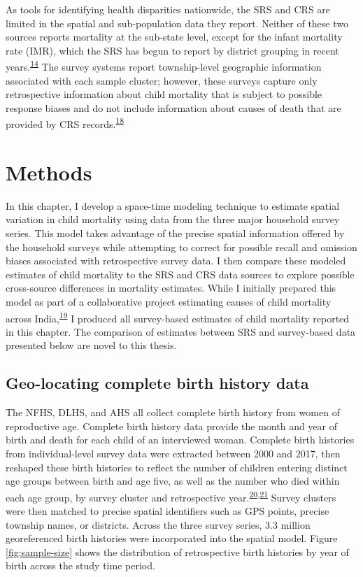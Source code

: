 \documentclass[
]{article}
\begin{document}
As tools for identifying health disparities nationwide, the SRS and CRS are limited in the spatial and sub-population data they report. Neither of these two sources reports mortality at the sub-state level, except for the infant mortality rate (IMR), which the SRS has begun to report by district grouping in recent years.\textsuperscript{\protect\hyperlink{ref-Mahapatra2010}{14}} The survey systems report township-level geographic information associated with each sample cluster; however, these surveys capture only retrospective information about child mortality that is subject to possible response biases and do not include information about causes of death that are provided by CRS records.\textsuperscript{\protect\hyperlink{ref-Dandona2016}{18}}

\hypertarget{methods}{%
\section{Methods}\label{methods}}

In this chapter, I develop a space-time modeling technique to estimate spatial variation in child mortality using data from the three major household survey series. This model takes advantage of the precise spatial information offered by the household surveys while attempting to correct for possible recall and omission biases associated with retrospective survey data. I then compare these modeled estimates of child mortality to the SRS and CRS data sources to explore possible cross-source differences in mortality estimates. While I initially prepared this model as part of a collaborative project estimating causes of child mortality across India,\textsuperscript{\protect\hyperlink{ref-Dandona2020}{19}} I produced all survey-based estimates of child mortality reported in this chapter. The comparison of estimates between SRS and survey-based data presented below are novel to this thesis.

\hypertarget{geo-locating-complete-birth-history-data}{%
\subsection{Geo-locating complete birth history data}\label{geo-locating-complete-birth-history-data}}

The NFHS, DLHS, and AHS all collect complete birth history from women of reproductive age. Complete birth history data provide the month and year of birth and death for each child of an interviewed woman. Complete birth histories from individual-level survey data were extracted between 2000 and 2017, then reshaped these birth histories to reflect the number of children entering distinct age groups between birth and age five, as well as the number who died within each age group, by survey cluster and retrospective year.\textsuperscript{\protect\hyperlink{ref-Burstein2019}{20},\protect\hyperlink{ref-Ahmad2000}{21}} Survey clusters were then matched to precise spatial identifiers such as GPS points, precise township names, or districts. Across the three survey series, 3.3 million georeferenced birth histories were incorporated into the spatial model. Figure \ref{fig:sample-size} shows the distribution of retrospective birth histories by year of birth across the study time period.
\end{document}

